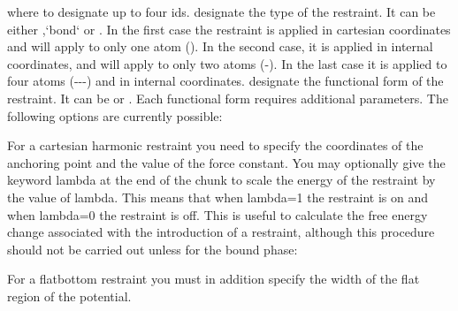 \documentclass[letterpaper,10pt,english]{sphinxmanual}
\begin{document}
where  to  designate up to four ids.  designate the type of the restraint. It can be either ,{}`bond{}` or . In the first case the restraint is applied in cartesian coordinates and will apply to only one atom (). In the second case, it is applied in internal coordinates, and will apply to only two atoms (-). In the last case it is applied to four atoms (---) and in internal coordinates.  designate the functional form of the restraint. It can be  or . Each functional form requires additional parameters. The following options are currently possible:

\ignorespaces 
\def\sphinxLiteralBlockLabel{\label{\detokenize{protoms:index-77}}}
%
\begin{sphinxVerbatim}[commandchars=\\\{\}]
          \PYG{p}{[}\PYG{p}{]}
\end{sphinxVerbatim}

For a cartesian harmonic restraint you need to specify the coordinates of the anchoring point and the value of the force constant. You may optionally give the keyword lambda at the end of the chunk to scale the energy of the restraint by the value of lambda. This means that when lambda=1 the restraint is on and when lambda=0 the restraint is off. This is useful to calculate the free energy change associated with the introduction of a restraint, although this procedure should not be carried out unless for the bound phase:

%
\begin{sphinxVerbatim}[commandchars=\\\{\}]
          
\end{sphinxVerbatim}

For a flatbottom restraint you must in addition specify the width of the flat region of the potential.
\end{document}
